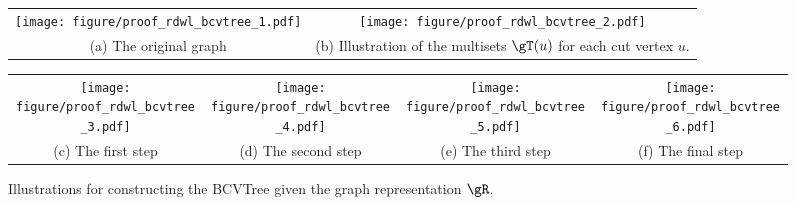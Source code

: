 \documentclass{article} %
\begin{document}
\begin{figure}[t]
    \centering
    \small
    \begin{tabular}{cc}
        \texttt{[image: figure/proof\_rdwl\_bcvtree\_1.pdf]} & \texttt{[image: figure/proof\_rdwl\_bcvtree\_2.pdf]} \\
        (a) The original graph & (b) Illustration of the multisets $\gT(u)$ for each cut vertex $u$.
    \end{tabular}
    \begin{tabular}{cccc}
        \texttt{[image: figure/proof\_rdwl\_bcvtree\_3.pdf]} & \texttt{[image: figure/proof\_rdwl\_bcvtree\_4.pdf]} & \texttt{[image: figure/proof\_rdwl\_bcvtree\_5.pdf]} & \texttt{[image: figure/proof\_rdwl\_bcvtree\_6.pdf]} \\
        (c) The first step & (d) The second step & (e) The third step & (f) The final step 
    \end{tabular}
    \caption{Illustrations for constructing the BCVTree given the graph representation $\gR$.}
    \label{fig:proof_rdwl_bcvtree}
    \vspace{-5pt}
\end{figure}
\end{document}
